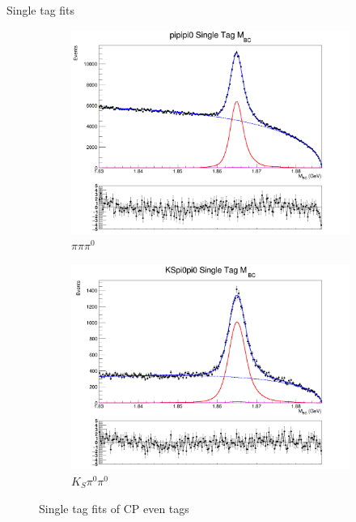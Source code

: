 \documentclass{beamer}
\begin{document}
\begin{frame}{Single tag fits}
\begin{figure}
\begin{subfigure}{0.33\textwidth}
      \includegraphics[width=1.0\textwidth]{Plots/pipipi0_SingleTag_MBC_Plot.png}
      \caption{$\pi\pi\pi^0$}
    \end{subfigure}%
    \begin{subfigure}{0.33\textwidth}
      \centering
      \includegraphics[width=1.0\textwidth]{Plots/KSpi0pi0_SingleTag_MBC_Plot.png}
      \caption{$K_S\pi^0\pi^0$}
    \end{subfigure}
    \caption{Single tag fits of CP even tags}
  \end{figure}
\end{frame}
\end{document}
